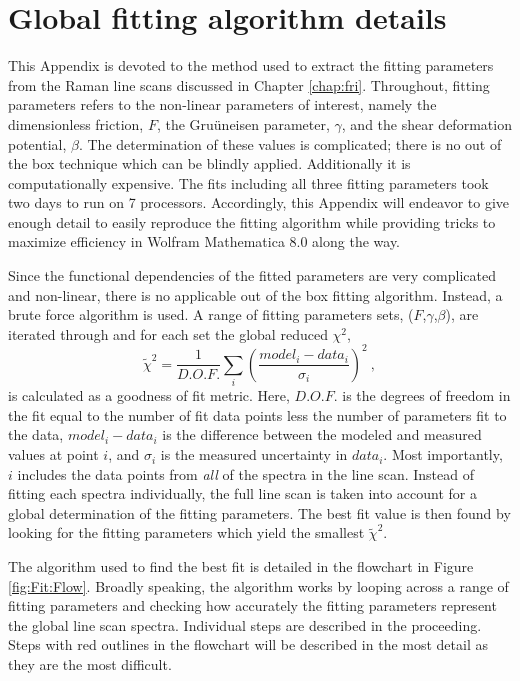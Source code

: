 \chapter{Global fitting algorithm details \label{chap:Fit}}
This Appendix is devoted to the method used to extract the fitting parameters from the Raman line scans discussed in Chapter \ref{chap:fri}.
Throughout, fitting parameters refers to the non-linear parameters of interest, namely the dimensionless friction, $F$, the Gru\"uneisen parameter, $\gamma$, and the shear deformation potential, $\beta$.
The determination of these values is complicated; there is no out of the box technique which can be blindly applied.
Additionally it is computationally expensive.
The fits including all three fitting parameters took two days to run on 7 processors.
Accordingly, this Appendix will endeavor to give enough detail to easily reproduce the fitting algorithm while providing tricks to maximize efficiency in Wolfram Mathematica 8.0 along the way.

Since the functional dependencies of the fitted parameters are very complicated and non-linear, there is no applicable out of the box fitting algorithm.
Instead, a brute force algorithm is used.
A range of fitting parameters sets, ($F$,$\gamma$,$\beta$), are iterated through and for each set the global reduced $\chi^2$, 
\begin{equation*}
	\tilde{\chi}^2=\frac{1}{D.O.F.} \sum_i \left( \frac{model_i-data_i}{\sigma_i} \right)^2 \ ,
\end{equation*}
is calculated as a goodness of fit metric.
Here, $D.O.F.$ is the degrees of freedom in the fit equal to the number of fit data points less the number of parameters fit to the data, $model_i-data_i$ is the difference between the modeled and measured values at point $i$, and $\sigma_i$ is the measured uncertainty in $data_i$.
Most importantly, $i$ includes the data points from \emph{all} of the spectra in the line scan.
Instead of fitting each spectra individually, the full line scan is taken into account for a global determination of the fitting parameters.
The best fit value is then found by looking for the fitting parameters which yield the smallest $\tilde{\chi}^2$.

The algorithm used to find the best fit is detailed in the flowchart in Figure \ref{fig:Fit:Flow}.
Broadly speaking, the algorithm works by looping across a range of fitting parameters and checking how accurately the fitting parameters represent the global line scan spectra.
Individual steps are described in the proceeding.
Steps with red outlines in the flowchart will be described in the most detail as they are the most difficult.

